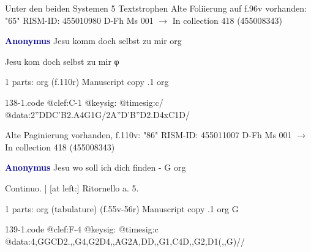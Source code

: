\documentclass[twocolumn]{book}
\begin{document}
\newline Unter den beiden Systemen 5 Textstrophen
\newline Alte Foliierung auf f.96v vorhanden: "65"
\newline RISM-ID: 455010980
\newline D-Fh  Ms 001
\newline $\rightarrow$ In collection 418 (455008343)
      
\newline \par \vspace{7pt} \textcolor{darkblue}{\textbf{Anonymus  }}
\newline Jesu komm doch selbst zu mir
\newline org
\newline \begin{itshape} Jesu kom doch selbst zu mir φ\end{itshape} 
\newline \textcolor{darkblue}{}  1 parts: org  (f.110r)
\newline Manuscript copy
.1  org  
\begin{filecontents*}{138-1.code}
@clef:C-1
@keysig:
@timesig:c/
@data:2''DDC'B2.A4G1G/2A''D'B''D2.D4xC1D/
\end{filecontents*}
\newline
%

\newline Alte Paginierung vorhanden, f.110v: "86"
\newline RISM-ID: 455011007
\newline D-Fh  Ms 001
\newline $\rightarrow$ In collection 418 (455008343)
      
\newline \par \vspace{7pt} \textcolor{darkblue}{\textbf{Anonymus  }}
\newline Jesu wo soll ich dich finden - G
\newline org
\newline \begin{itshape}[f.55v, heading:] Continuo. | [at left:] Ritornello a. 5.\end{itshape} 
\newline \textcolor{darkblue}{}  1 parts: org (tabulature)  (f.55v-56r)
\newline Manuscript copy
.1  org  G  
\begin{filecontents*}{139-1.code}
@clef:F-4
@keysig:
@timesig:c
@data:4,GGCD2.,,G4,G2D4,,AG2A,DD,,G1,C4D,,G2,D1(,,G)//
\end{filecontents*}
\newline
%
\end{document}
